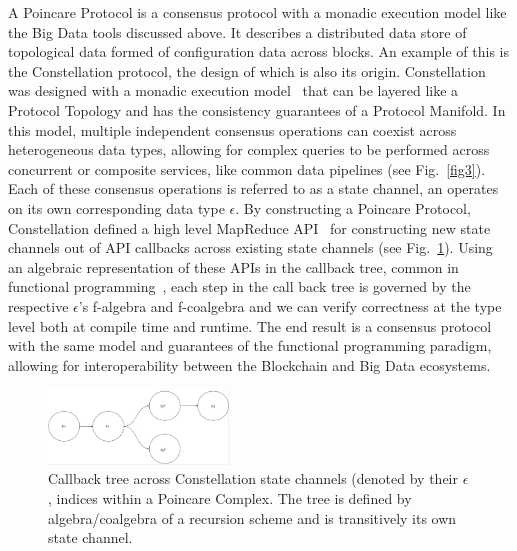 \documentclass[runningheads]{llncs}
\begin{document}
A Poincare Protocol is a consensus protocol with a monadic execution model like the Big Data tools discussed above. It describes a distributed data store of topological data formed of configuration data across blocks. An example of this is the Constellation protocol, the design of which is also its origin. Constellation was designed with a monadic execution model~\cite{ref_url6} that can be layered like a Protocol Topology and has the consistency guarantees of a Protocol Manifold. In this model, multiple independent consensus operations can coexist across heterogeneous data types, allowing for complex queries to be performed across concurrent or composite services, like common data pipelines (see Fig.~\ref{fig3}). Each of these consensus operations is referred to as a state channel, an operates on its own corresponding data type $\epsilon$. By constructing a Poincare Protocol, Constellation defined a high level MapReduce API~\cite{ref_url3} for constructing new state channels out of API callbacks across existing state channels (see Fig.~\ref{fig4}). Using an algebraic representation of these APIs in the callback tree, common in functional programming~\cite{ref_book3}, each step in the call back tree is governed by the respective $\epsilon$'s f-algebra and f-coalgebra and we can verify correctness at the type level both at compile time and runtime. The end result is a consensus protocol with the same model and guarantees of the functional programming paradigm, allowing for interoperability between the Blockchain and Big Data ecosystems. 
\begin{figure}
\centering
\includegraphics[height=2cm,width=0.4\columnwidth]{rec_tree_wide.png}
\caption{Callback tree across Constellation state channels (denoted by their $\epsilon$, indices within a Poincare Complex. The tree is defined by algebra/coalgebra of a recursion scheme and is transitively its own state channel.} \label{fig4}
\end{figure}
\end{document}
